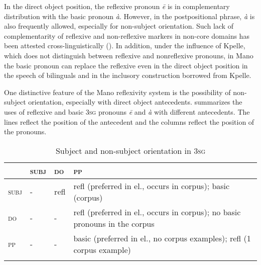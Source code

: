\documentclass[output=paper]{langscibook}
\begin{document}
In the direct object position, the reflexive pronoun \textit{ē} is in complementary distribution with the basic pronoun \textit{à}. However, in the postpositional phrase, \textit{à} is also frequently allowed, especially for non-subject orientation. Such lack of complementarity of reflexive and non-reflexive markers in non-core domains has been attested cross-linguistically (\citealt{TesteletsToldova1998}). In addition, under the influence of Kpelle, which does not distinguish between reflexive and nonreflexive pronouns, in Mano the basic pronoun can replace the reflexive even in the direct object position in the speech of bilinguals and in the inclusory construction borrowed from Kpelle.

One distinctive feature of the Mano reflexivity system is the possibility of non-subject orientation, especially with direct object antecedents.  summarizes the uses of reflexive and basic 3\textsc{sg} pronouns \textit{ē} and \textit{à} with different antecedents. The lines reflect the position of the antecedent and the columns reflect the position of the pronouns. 

\begin{table}
\begin{tabularx}{0.8\textwidth}{XXXp{5cm}} 
\lsptoprule
&\textsc{subj} & \textsc{do} & \textsc{pp}\\
\hline
\textsc{subj} & {}- & refl & refl (preferred in el., occurs in corpus); basic (corpus)\\
\textsc{do} & {}- & {}- & refl (preferred in el., occurs in corpus); no basic pronouns in the corpus\\
\textsc{pp} & {}- & {}- & basic (preferred in el., no corpus examples); refl (1 corpus example)\\
\lspbottomrule
\end{tabularx}
\caption{Subject and non-subject orientation in 3\textsc{sg}}
\label{tab:Kachaturyan:2}
\end{table}
\end{document}
